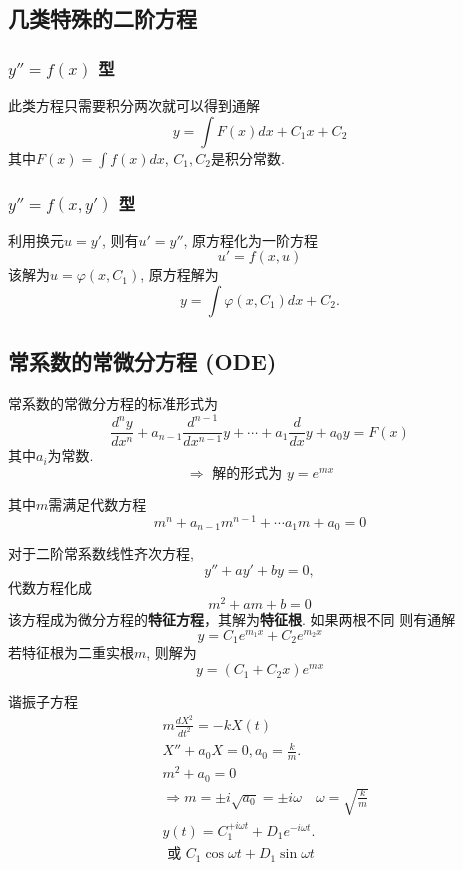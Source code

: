 \subsection{几类特殊的二阶方程}
\subsubsection{ $y'' = f(x)$ 型}
此类方程只需要积分两次就可以得到通解
\begin{equation}
    y = \int F(x) dx + C_1 x + C_2
\end{equation}
其中$F(x) = \int f(x) dx$, $C_1, C_2$是积分常数.
\subsubsection{ $y'' = f(x, y')$ 型}
利用换元$u = y'$, 则有$u' = y''$, 原方程化为一阶方程
$$ u' = f(x,u)$$
该解为$u = \varphi(x, C_1)$, 原方程解为
\begin{equation}
    y = \int \varphi(x, C_1) dx  + C_2.
\end{equation}


\subsection{ 常系数的常微分方程 (ODE)}
常系数的常微分方程的标准形式为
\begin{equation}
\frac{d^n y}{d x^n}+a_{n-1}\frac{d^{n-1} }{d x^{n-1}} y  + \cdots +a_{1} \frac{d}{d x} y+a_0 y=F(x)
\end{equation}
其中$a_i$为常数.
$$
\Rightarrow \text { 解的形式为 } y=e^{m x}
$$

其中$m$需满足代数方程
$$
m^n+a_{n-1} m^{n-1}+\cdots a_1 m+a_0=0
$$

对于二阶常系数线性齐次方程, $$
y'' + a y' + by = 0,
$$
代数方程化成
\begin{equation}
    m^2 + a m + b = 0
\end{equation}
该方程成为微分方程的\textbf{特征方程}，其解为\textbf{特征根}. 如果两根不同
则有通解
\begin{equation}
    y = C_1 e^{m_1 x} +  C_2 e^{m_2 x} 
\end{equation}
若特征根为二重实根$m$, 则解为 
\begin{equation}
    y = (C_1 + C_2  x) e^{m x}
\end{equation}
\begin{example}
    谐振子方程
$$
\begin{aligned}
& m \frac{d X^2}{d t^2}=-k X(t) \\
& X''+a_0 X=0, a_0=\frac{k}{m} . \\
& m^2+a_0=0 \\
& \Rightarrow m= \pm i \sqrt{a_0}= \pm i \omega \quad \omega=\sqrt{\frac{k}{m}} \\
& y(t)=C_1 ^{+i \omega t}+D_{1} e^{-i \omega t} . \\
& \text { 或 } C_1 \cos \omega t+D_1 \sin \omega t
\end{aligned}
$$
\end{example}


